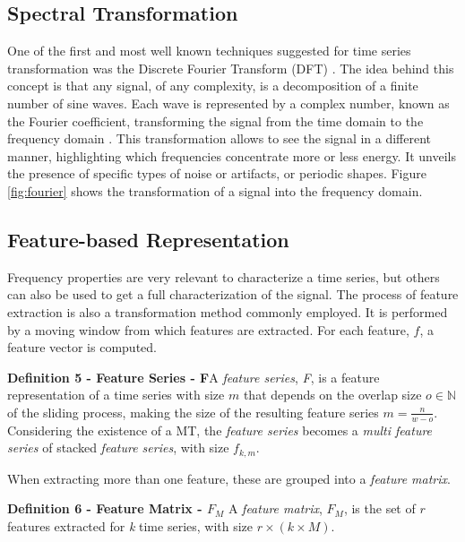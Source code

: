 \subsection{Spectral Transformation}
\label{subsec:spec_transform}

One of the first and most well known techniques suggested for time series transformation was the Discrete Fourier Transform (DFT) \citep{fourier}. The idea behind this concept is that any signal, of any complexity, is a decomposition of a finite number of sine waves. Each wave is represented by a complex number, known as the Fourier coefficient, transforming the signal from the time domain to the frequency domain \cite{fourier2}. This transformation allows to see the signal in a different manner, highlighting which frequencies concentrate more or less energy. It unveils the presence of specific types of noise or artifacts, or periodic shapes. Figure \ref{fig:fourier} shows the transformation of a signal into the frequency domain.


\subsection{Feature-based Representation}
\label{subsec:features}

Frequency properties are very relevant to characterize a time series, but others can also be used to get a full characterization of the signal. The process of feature extraction is also a transformation method commonly employed. It is performed by a moving window from which features are extracted. For each feature, $f$, a feature vector is computed.


\item \textbf{Definition 5 - Feature Series - F}A \textit{feature series}, \textit{F}, is a feature representation of a time series with size $m$ that depends on the overlap size $o \in \mathbb{N}$ of the sliding process, making the size of the resulting feature series $m = \frac{n}{w-o}$. Considering the existence of a MT, the \textit{feature series} becomes a \textit{multi feature series} of stacked \textit{feature series}, with size $f_{k,m}$.
    
When extracting more than one feature, these are grouped into a \textit{feature matrix}.
    
    \item \textbf{Definition 6 - Feature Matrix - $F_M$ } A \textit{feature matrix}, $F_M$, is the set of $r$ features extracted for \textit{k} time series, with size $r \times (k\times M)$.


